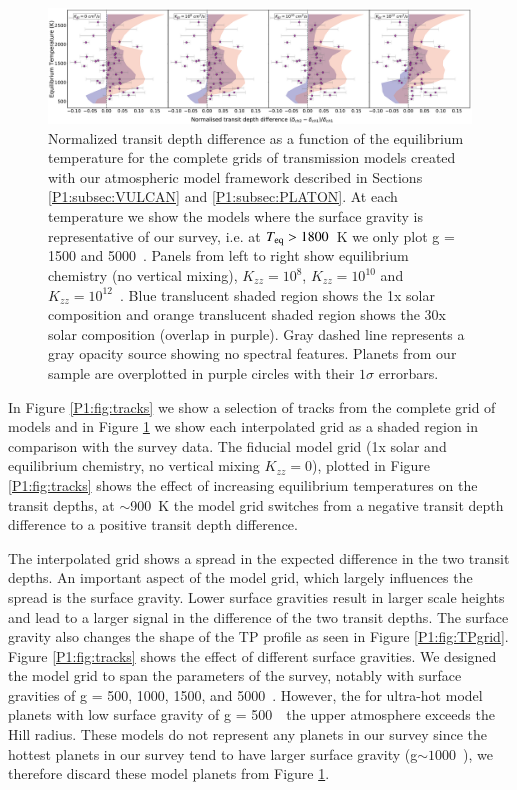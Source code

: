 \begin{figure}
    \centering
    \includegraphics[width=\linewidth]{Kzzmodels.pdf}
    \caption{Normalized \spitzer transit depth difference as a function of the equilibrium temperature for the complete grids of transmission models created with our atmospheric model framework described in Sections \ref{P1:subsec:VULCAN} and \ref{P1:subsec:PLATON}. At each temperature we show the models where the surface gravity is representative of our survey, i.e. at $T_{\rm eq}>1800$~K we only plot g = 1500 and 5000~\cmss. Panels from left to right show equilibrium chemistry (no vertical mixing), $K_{zz} = 10^8$, $K_{zz} = 10^{10}$ and $K_{zz} = 10^{12}$~\cmcms. Blue translucent shaded region shows the 1x solar composition and orange translucent shaded region shows the 30x solar composition (overlap in purple). Gray dashed line represents a gray opacity source showing no spectral features. Planets from our sample are overplotted in purple circles with their $1\sigma$ errorbars.}
    \label{P1:fig:Kzzmodels}
\end{figure}

In Figure \ref{P1:fig:tracks} we show a selection of tracks from the complete grid of models and in Figure \ref{P1:fig:Kzzmodels} we show each interpolated grid as a shaded region in comparison with the survey data. The fiducial model grid (1x solar and equilibrium chemistry, no vertical mixing $K_{zz}=0$), plotted in Figure \ref{P1:fig:tracks} shows the effect of increasing equilibrium temperatures on the transit depths, at $\sim$900~K the model grid switches from a negative transit depth difference to a positive transit depth difference.

The interpolated grid shows a spread in the expected difference in the two transit depths. An important aspect of the model grid, which largely influences the spread is the surface gravity. Lower surface gravities result in larger scale heights and lead to a larger signal in the difference of the two \spitzerIRAC transit depths. The surface gravity also changes the shape of the TP profile as seen in Figure \ref{P1:fig:TPgrid}. Figure \ref{P1:fig:tracks} shows the effect of different surface gravities. We designed the model grid to span the parameters of the survey, notably with surface gravities of g = 500, 1000, 1500, and 5000~\cmss. However, the for ultra-hot model planets with low surface gravity of g = 500~\cmss~the upper atmosphere exceeds the Hill radius. These models do not represent any planets in our survey since the hottest planets in our survey tend to have larger surface gravity (g$\sim1000$~\cmss), we therefore discard these model planets from Figure \ref{P1:fig:Kzzmodels}.

